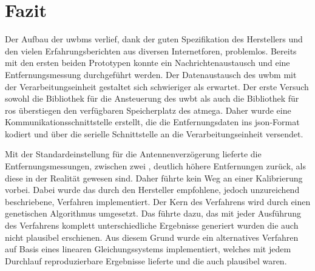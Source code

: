 %
%
%		
%
\section{Fazit}

Der Aufbau der \glspl{uwbm} verlief, dank der guten Spezifikation des Herstellers und den vielen Erfahrungsberichten aus diversen Internetforen, problemlos. Bereits mit den ersten beiden Prototypen konnte ein Nachrichtenaustausch und eine Entfernungsmessung durchgeführt werden. Der Datenaustausch des \gls{uwbm} mit der Verarbeitungseinheit gestaltet sich schwieriger als erwartet. Der erste Versuch sowohl die Bibliothek für die Ansteuerung des \gls{uwbt} als auch die Bibliothek für \gls{ros} überstiegen den verfügbaren Speicherplatz des \gls{atmega}. Daher wurde eine Kommunikationsschnittstelle erstellt, die die Entfernungsdaten ins \gls{json}-Format kodiert und über die serielle Schnittstelle an die Verarbeitungseinheit versendet.

Mit der Standardeinstellung für die Antennenverzögerung lieferte die Entfernungsmessungen, zwischen zwei , deutlich höhere Entfernungen zurück, als diese in der Realität gewesen sind. Daher führte kein Weg an einer Kalibrierung vorbei. Dabei wurde das durch den Hersteller empfohlene, jedoch unzureichend beschriebene, Verfahren implementiert. Der Kern des Verfahrens wird durch einen genetischen Algorithmus umgesetzt. Das führte dazu, das mit jeder Ausführung des Verfahrens komplett unterschiedliche Ergebnisse generiert wurden die auch nicht plausibel erschienen. Aus diesem Grund wurde ein alternatives Verfahren auf Basis eines linearen Gleichungssystems implementiert, welches mit jedem Durchlauf reproduzierbare Ergebnisse lieferte und die auch plausibel waren.

